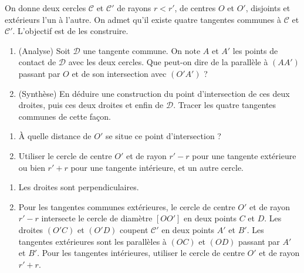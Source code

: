 \begin{exo}%
On donne deux cercles $\mathcal C$ et $\mathcal C'$ de rayons $r < r'$, de centres $O$ et $O'$, disjoints et extérieurs l'un à l'autre. On admet qu'il existe quatre tangentes communes  à $\mathcal C$ et $\mathcal C'$. L'objectif est de les construire.
\begin{enumerate}
\item (Analyse) Soit $\mathcal D$ une tangente commune. On note $A$ et $A'$ les points de contact de $\mathcal D$ avec les deux cercles. Que peut-on dire de la parallèle à $(AA')$ passant par $O$ et de son intersection avec $(O'A')$ ? 
\item (Synthèse) En déduire une construction du point d'intersection de ces deux droites, puis ces deux droites et enfin de $\mathcal D$. Tracer les quatre tangentes communes de cette façon.
\end{enumerate}


\begin{hint}   
\begin{enumerate}
\item À quelle distance de $O'$ se situe ce point d'intersection ?
\item Utiliser  le cercle de centre $O'$ et de rayon $r'-r$ pour une tangente \og extérieure\fg{} ou bien $r'+r$ pour une  tangente \og intérieure\fg, et un autre cercle.
\end{enumerate}
\end{hint}      

\begin{sol} 
\begin{enumerate}
\item Les droites sont perpendiculaires.
\item Pour les tangentes communes extérieures, le cercle de centre $O'$ et de rayon $r'-r$ intersecte le cercle de diamètre $[OO']$ en deux points $C$ et $D$. Les droites $(O'C)$ et $(O'D)$ coupent $\mathcal C'$ en deux points $A'$ et $B'$. Les tangentes extérieures sont les parallèles à $(OC)$ et $(OD)$ passant par $A'$ et $B'$. Pour les tangentes intérieures, utiliser le cercle de centre $O'$ et de rayon $r'+r$. 
\end{enumerate}
\end{sol}  
\end{exo}  





